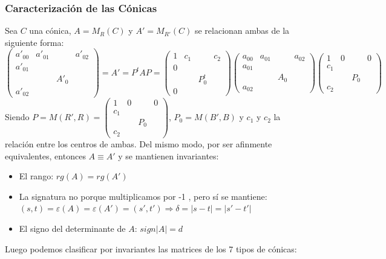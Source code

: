 \documentclass[10pt,a4paper,openright]{book}
\theoremstyle{break}
\begin{document}
\subsubsection*{Caracterización de las Cónicas}
Sea $C$ una cónica, $A = M_R (C) $ y $A' = M_{R'} (C)$ se relacionan ambas de la siguiente forma:
$$\left(\begin{array}{c|ccc}
a'_{00} & a'_{01}& & a'_{02} \\
\hline
a'_{01} & & &   \\
 & & A'_0 & \\
a'_{02} &  & & 
\end{array}
\right)= A' = P^t A P = \left(\begin{array}{c|ccc}
1 & c_1 & & c_2 \\
\hline
0 & & &   \\
 & & P^t_0 & \\
0 &  & & 
\end{array}
\right)\left(\begin{array}{c|ccc}
a_{00} & a_{01}& & a_{02} \\
\hline
a_{01} & & &   \\
 & & A_0 & \\
a_{02} &  & & 
\end{array}
\right) \left(\begin{array}{c|ccc}
1 & 0 && 0 \\
\hline
c_1 & &&   \\
 & & P_0 & \\
c_2 & &&
\end{array}
\right)$$
Siendo $P = M(R', R) = \left(\begin{array}{c|ccc}
1 & 0 && 0 \\
\hline
c_1 & &&   \\
 & & P_0 & \\
c_2 & &&
\end{array}
\right)$, $P_0 = M (B', B) $ y $c_1$ y $c_2$ la relación entre los centros de ambas. Del mismo modo, por ser afinmente equivalentes, entonces $A \equiv A'$ y se mantienen invariantes:
\begin{itemize}
\item El rango: $rg(A) = rg(A')$
\item La signatura no porque multiplicamos por -1 , pero sí se mantiene: $(s,t) = \varepsilon(A) = \varepsilon(A') = (s', t') \Rightarrow \delta = |s - t| = |s' - t'|$
\item El signo del determinante de $A$: $sign|A| = d$
\end{itemize}
Luego podemos clasificar por invariantes las matrices de los 7 tipos de cónicas:
\end{document}
